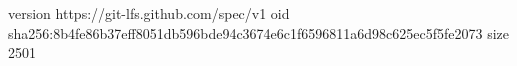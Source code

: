 version https://git-lfs.github.com/spec/v1
oid sha256:8b4fe86b37eff8051db596bde94c3674e6c1f6596811a6d98c625ec5f5fe2073
size 2501
